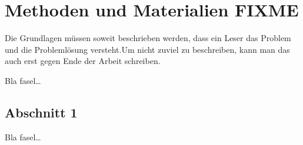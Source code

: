 
\chapter{Methoden und Materialien FIXME}
\label{ch:Grundlagen}
Die Grundlagen müssen soweit beschrieben
werden, dass ein Leser das Problem und
die Problemlösung  versteht.Um nicht zuviel 
zu beschreiben, kann man das auch erst gegen 
Ende der Arbeit schreiben.

Bla fasel\ldots

\section{Abschnitt 1}
\label{ch:Grundlagen:sec:Abschnitt1}

Bla fasel\ldots

